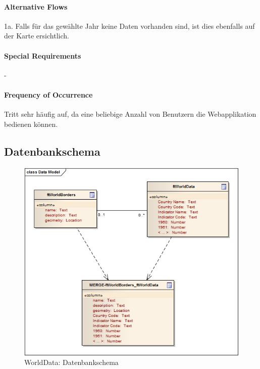\paragraph{Alternative Flows}
1a. Falls für das gewählte Jahr keine Daten vorhanden sind, ist dies ebenfalls auf der Karte ersichtlich.

\paragraph{Special Requirements}
-

\paragraph{Frequency of Occurrence}
Tritt sehr häufig auf, da eine beliebige Anzahl von Benutzern die Webapplikation bedienen können.

\subsection{Datenbankschema}
\begin{figure}[H]
	\centering
	\includegraphics[scale=0.8]{images/usecase1-worlddata/uml/worlddata-datamodel.png}
	\caption{WorldData: Datenbankschema}
	\label{worlddata-datamodel}
\end{figure}

